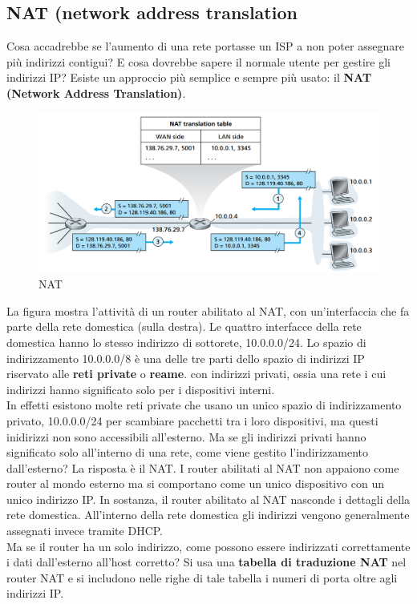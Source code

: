 \documentclass[11pt,a4paper]{book}
\begin{document}
\subsection{NAT (network address translation}
Cosa accadrebbe se l'aumento di una rete portasse un ISP a non poter assegnare più indirizzi contigui? E cosa dovrebbe sapere il normale utente per gestire gli indirizzi IP? Esiste un approccio più semplice e sempre più usato: il \textbf{NAT (Network Address Translation)}.
\begin{figure}
	\includegraphics[scale=0.4]{img/058.png}
	\caption{NAT}
\end{figure}
La figura mostra l'attività di un router abilitato al NAT, con un'interfaccia che fa parte della rete domestica (sulla destra). Le quattro interfacce della rete domestica hanno lo stesso indirizzo di sottorete, 10.0.0.0/24. Lo spazio di indirizzamento 10.0.0.0/8 è una delle tre parti dello spazio di indirizzi IP riservato alle \textbf{reti private} o \textbf{reame}. con indirizzi privati, ossia una rete i cui indirizzi hanno significato solo per i dispositivi interni. \\
In effetti esistono molte reti private che usano un unico spazio di indirizzamento privato, 10.0.0.0/24 per scambiare pacchetti tra i loro dispositivi, ma questi inidirizzi non sono accessibili all'esterno. Ma se gli indirizzi privati hanno significato solo all'interno di una rete, come viene gestito l'indirizzamento dall'esterno? La risposta è il NAT. I router abilitati al NAT non appaiono come router al mondo esterno ma si comportano come un unico dispositivo con un unico indirizzo IP. In sostanza, il router abilitato al NAT nasconde i dettagli della rete domestica. All'interno della rete domestica gli indirizzi vengono generalmente assegnati invece tramite DHCP. \\
Ma se il router ha un solo indirizzo, come possono essere indirizzati correttamente i dati dall'esterno all'host corretto? Si usa una \textbf{tabella di traduzione NAT} nel router NAT e si includono nelle righe di tale tabella i numeri di porta oltre agli indirizzi IP. \\
\end{document}
